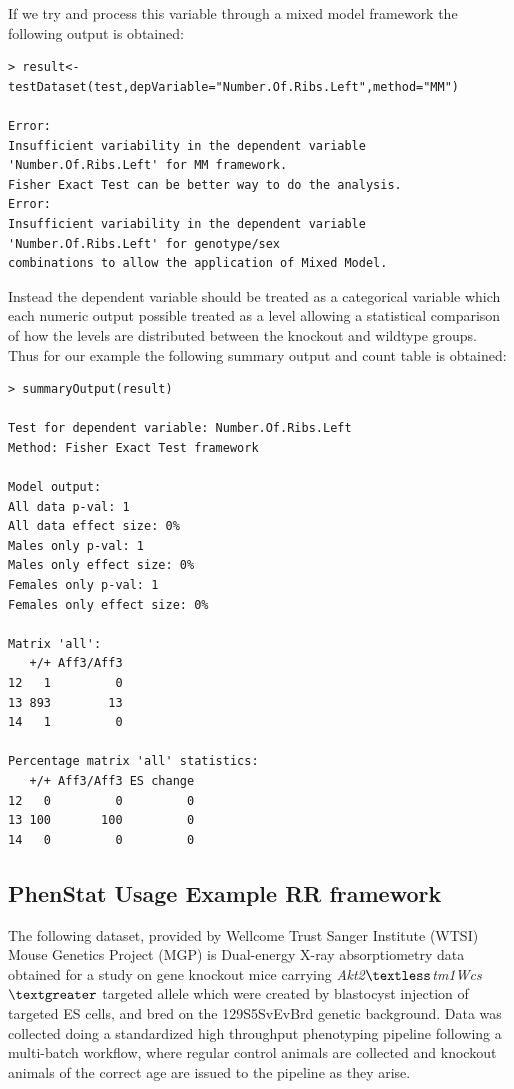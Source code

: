 \documentclass[12pt,a4paper]{article}
\begin{document}
If we try and process this variable through a mixed model framework the following output is obtained: 


\begingroup
    \fontsize{8pt}{12pt}\selectfont
\begin{verbatim}
> result<-testDataset(test,depVariable="Number.Of.Ribs.Left",method="MM")

Error:
Insufficient variability in the dependent variable 'Number.Of.Ribs.Left' for MM framework. 
Fisher Exact Test can be better way to do the analysis.
Error:
Insufficient variability in the dependent variable 'Number.Of.Ribs.Left' for genotype/sex 
combinations to allow the application of Mixed Model.
\end{verbatim}
\endgroup 

Instead the dependent variable should be treated as a categorical variable which each numeric output possible treated as a level allowing 
a statistical comparison of how the levels are distributed between the knockout and wildtype groups.  
Thus for our example the following summary output and count table is obtained: 

\begingroup
    \fontsize{8pt}{12pt}\selectfont
\begin{verbatim}
> summaryOutput(result)

Test for dependent variable: Number.Of.Ribs.Left
Method: Fisher Exact Test framework

Model output:
All data p-val: 1
All data effect size: 0%
Males only p-val: 1
Males only effect size: 0%
Females only p-val: 1
Females only effect size: 0%

Matrix 'all':
   +/+ Aff3/Aff3
12   1         0
13 893        13
14   1         0

Percentage matrix 'all' statistics:
   +/+ Aff3/Aff3 ES change
12   0         0         0
13 100       100         0
14   0         0         0

\end{verbatim}
\endgroup 

\subsection{PhenStat Usage Example RR framework}
The following dataset, provided by Wellcome Trust Sanger Institute (WTSI) Mouse Genetics Project (MGP) is Dual-energy X-ray absorptiometry data obtained for a study on gene knockout mice carrying \textit{Akt2$\textless$tm1Wcs$\textgreater$} targeted allele which were created by blastocyst injection of targeted ES cells, and bred on the 129S5SvEvBrd genetic background. Data was collected doing a standardized high throughput phenotyping pipeline following a multi-batch workflow, where regular control animals are collected and knockout animals of the correct age are issued to the pipeline as they arise. 
\end{document}
